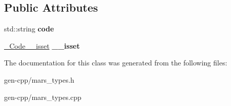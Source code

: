 \subsection*{Public Attributes}
\begin{DoxyCompactItemize}
\item 
\mbox{\label{classMARS_1_1Code_a29ea96edab2f02e49a96b47c1989ad7d}} 
std\+::string {\bfseries code}
\item 
\mbox{\label{classMARS_1_1Code_ac52cfc9f20d2e1d2a2942183083f1b4e}} 
\hyperlink{structMARS_1_1__Code____isset}{\+\_\+\+Code\+\_\+\+\_\+isset} {\bfseries \+\_\+\+\_\+isset}
\end{DoxyCompactItemize}


The documentation for this class was generated from the following files\+:\begin{DoxyCompactItemize}
\item 
gen-\/cpp/mars\+\_\+types.\+h\item 
gen-\/cpp/mars\+\_\+types.\+cpp\end{DoxyCompactItemize}
